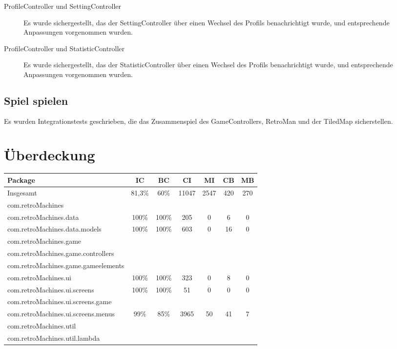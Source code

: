 \documentclass[parskip=full]{scrreprt}
\begin{document}
\begin{description}
	\item[ProfileController und SettingController] Es wurde sichergestellt, das der SettingController über einen Wechsel des Profils benachrichtigt wurde, und entsprechende Anpassungen vorgenommen wurden.
	\item[ProfileController und StatisticController] Es wurde sichergestellt, das der StatisticController über einen Wechsel des Profils benachrichtigt wurde, und entsprechende Anpassungen vorgenommen wurden.
\end{description}

\section{Spiel spielen}

Es wurden Integrationstests geschrieben, die das Zusammenspiel des GameControllers, RetroMan und der TiledMap sicherstellen.

\chapter{Überdeckung}

\begin{tabular} { | l | c | c | c | c | c | c | }
	\hline
	\textbf{Package} & \textbf{IC} & \textbf{BC} & \textbf{CI} & \textbf{MI} & \textbf{CB} & \textbf{MB} \\
	\hline
	Insgesamt & 81,3\% & 60\% & 11047 & 2547 & 420 & 270 \\
	\hline
	com.retroMachines \\
	\hline
	com.retroMachines.data & 100\% & 100\% & 205 & 0 & 6 & 0  \\
	\hline
	com.retroMachines.data.models & 100\% & 100\% & 603 & 0 & 16 & 0 \\
	\hline
	com.retroMachines.game \\
	\hline
	com.retroMachines.game.controllers \\
	\hline
	com.retroMachines.game.gameelements \\
	\hline
	com.retroMachines.ui & 100\% & 100\% & 323 & 0 & 8 & 0 \\
	\hline
	com.retroMachines.ui.screens & 100\% & 100\% & 51 & 0 & 0 & 0 \\
	\hline
	com.retroMachines.ui.screens.game \\
	\hline
	com.retroMachines.ui.screens.menus & 99\% & 85\% & 3965 & 50 & 41 & 7 \\
	\hline
	com.retroMachines.util \\
	\hline
	com.retroMachines.util.lambda \\
	\hline
\end{tabular}
\end{document}
